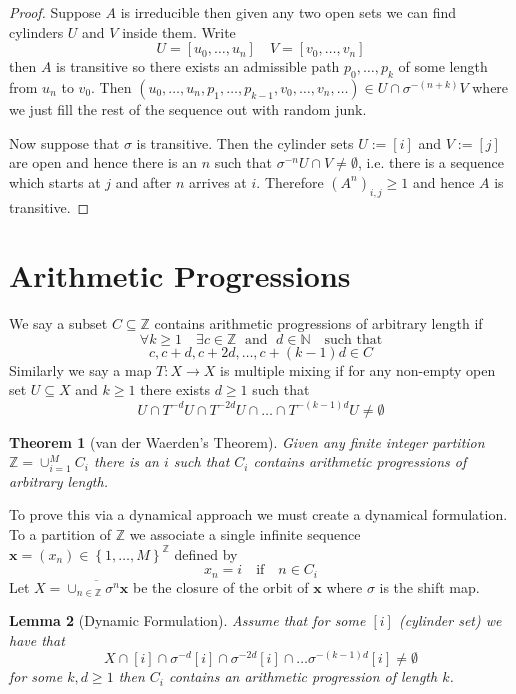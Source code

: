 \documentclass[11pt]{article}
\newcommand{\defeq}{:=}
\newcommand{\Z}{\mathbb{Z}}
\newcommand{\N}{\mathbb{N}}
\newcommand{\mv}[1]{\textbf{#1}}
\newenvironment{defin}
	{\begin{mdframed}[backgroundcolor=white, roundcorner=5pt, linewidth=1pt, linecolor=Green]
		\setlength{\parindent}{0pt}}
	{\end{mdframed}}
\newcommand{\mdf}[1]{{\color{Green} #1}}
\newtheorem{theorem}{Theorem}[section]
\newtheorem{lemma}[theorem]{Lemma}
\begin{document}
\begin{proof}
Suppose $A$ is irreducible then given any two open sets we can find cylinders $U$ and $V$ inside them.
Write
\[
	U=[ u_0, \dots, u_n] \quad V=[v_0, \dots, v_n]
\]
then $A$ is transitive so there exists an admissible path $p_0, \dots, p_k$ of some length from $u_n$ to $v_0$.
Then $(u_0, \dots, u_n, p_1, \dots, p_{k-1}, v_0, \dots, v_n, \dots)\in U \cap \sigma^{-(n+k)} V$ where we just fill the rest of the sequence out with random junk.

Now suppose that $\sigma$ is transitive.
Then the cylinder sets $U\defeq [i]$ and $V\defeq [j]$ are open and hence there is an $n$ such that $\sigma^{-n}U \cap V\neq\emptyset$, i.e. there is a sequence which starts at $j$ and after $n$ arrives at $i$.
Therefore $(A^n)_{i,j} \geq 1$ and hence $A$ is transitive.

\end{proof}

\section{Arithmetic Progressions}
\begin{defin}
	We say a subset $C\subseteq \Z$ \mdf{contains arithmetic progressions of arbitrary length} if
\[
	\forall k \geq 1 \quad \exists c\in \Z \;\text{ and }\; d\in\N \quad \text{such that}
\]\[
	c, c+d, c+ 2d, \dots, c+ (k-1)d\in C
\]
Similarly we say a map $T:X\to X$ is \mdf{multiple mixing} if for any non-empty open set $U\subseteq X$ and $k\geq 1$ there exists $d\geq 1$ such that
\[
	U\cap T^{-d}U \cap T^{-2d}U \cap \dots \cap T^{-(k-1)d}U\neq \emptyset
\]
\end{defin}

\begin{theorem}[van der Waerden's Theorem]
Given any finite integer partition $\Z=\cup_{i=1}^M C_i$ there is an $i$ such that $C_i$ contains arithmetic progressions of arbitrary length.
\end{theorem}

To prove this via a dynamical approach we must create a dynamical formulation.
To a partition of $\Z$ we associate  a single infinite sequence $\mv{x}=(x_n)\in\left\{1, \dots, M\right\}^\Z$ defined by
\[
	x_n=i\quad\text{if}\quad n\in C_i
\]
Let $X=\overline{\cup_{n\in\Z}\sigma^n\mv{x}}$ be the closure of the orbit of $\mv{x}$ where $\sigma$ is the shift map.

\begin{lemma}[Dynamic Formulation]
Assume that for some $[i]$ (cylinder set) we have that
\[
	X\cap [i] \cap \sigma^{-d}[i]\cap \sigma^{-2d}[i] \cap \dots \sigma^{-(k-1)d}[i]\neq\emptyset
\]
for some $k,d\geq 1$ then $C_i$ contains an arithmetic progression of length $k$.
\end{lemma}
\end{document}
